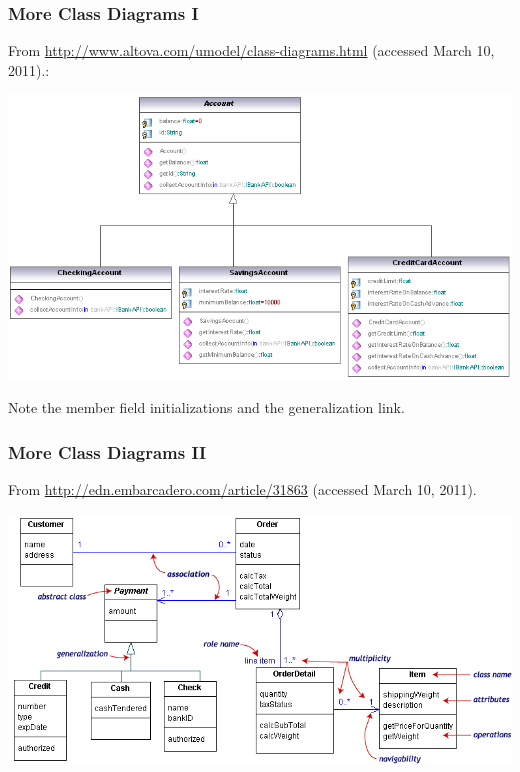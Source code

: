 \begin{frame}
\frametitle{More Class Diagrams I}

\begin{changemargin}{1cm}

From \url{http://www.altova.com/umodel/class-diagrams.html}
(accessed March 10, 2011).:

\begin{center}
\includegraphics[width=.8\textwidth]{images/UML_class_diagram_example.png}
\end{center}
Note the member field initializations and the generalization link.

\end{changemargin}
\end{frame}


\begin{frame}
\frametitle{More Class Diagrams II}

\begin{changemargin}{1cm}
From \url{http://edn.embarcadero.com/article/31863} (accessed March 10, 2011).
\begin{center}
\includegraphics[width=.8\textwidth]{images/classdiagramno3d.png}
\end{center}

\end{changemargin}
\end{frame}


